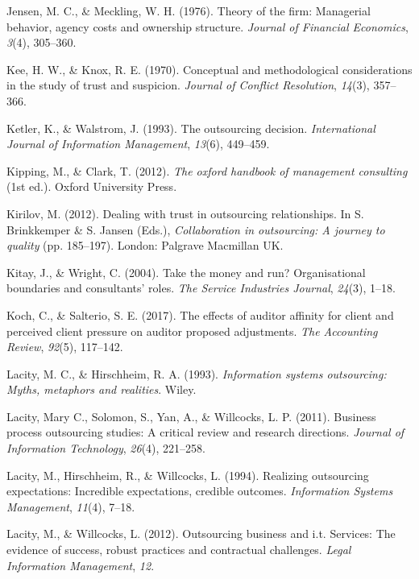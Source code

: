 \documentclass[
  man,floatsintext]{apa6}
\newlength{\cslhangindent}
\newenvironment{CSLReferences}[2] %
 {\begin{list}{}{%
  \setlength{\itemindent}{0pt}
  \setlength{\leftmargin}{0pt}
  \setlength{\parsep}{0pt}
  \ifodd #1
   \setlength{\leftmargin}{\cslhangindent}
   \setlength{\itemindent}{-1\cslhangindent}
  \fi
  \setlength{\itemsep}{#2\baselineskip}}}
 {\end{list}}
\begin{document}
\begin{CSLReferences}{1}{0}
Jensen, M. C., \& Meckling, W. H. (1976). Theory of the firm: Managerial behavior, agency costs and ownership structure. \emph{Journal of Financial Economics}, \emph{3}(4), 305--360.

Kee, H. W., \& Knox, R. E. (1970). Conceptual and methodological considerations in the study of trust and suspicion. \emph{Journal of Conflict Resolution}, \emph{14}(3), 357--366.

Ketler, K., \& Walstrom, J. (1993). The outsourcing decision. \emph{International Journal of Information Management}, \emph{13}(6), 449--459.

Kipping, M., \& Clark, T. (2012). \emph{The oxford handbook of management consulting} (1st ed.). Oxford University Press.

Kirilov, M. (2012). Dealing with trust in outsourcing relationships. In S. Brinkkemper \& S. Jansen (Eds.), \emph{Collaboration in outsourcing: A journey to quality} (pp. 185--197). London: Palgrave Macmillan UK.

Kitay, J., \& Wright, C. (2004). Take the money and run? Organisational boundaries and consultants' roles. \emph{The Service Industries Journal}, \emph{24}(3), 1--18.

Koch, C., \& Salterio, S. E. (2017). The effects of auditor affinity for client and perceived client pressure on auditor proposed adjustments. \emph{The Accounting Review}, \emph{92}(5), 117--142.

Lacity, M. C., \& Hirschheim, R. A. (1993). \emph{Information systems outsourcing: Myths, metaphors and realities}. Wiley.

Lacity, Mary C., Solomon, S., Yan, A., \& Willcocks, L. P. (2011). Business process outsourcing studies: A critical review and research directions. \emph{Journal of Information Technology}, \emph{26}(4), 221--258.

Lacity, M., Hirschheim, R., \& Willcocks, L. (1994). Realizing outsourcing expectations: Incredible expectations, credible outcomes. \emph{Information Systems Management}, \emph{11}(4), 7--18.

Lacity, M., \& Willcocks, L. (2012). Outsourcing business and i.t. Services: The evidence of success, robust practices and contractual challenges. \emph{Legal Information Management}, \emph{12}.


\end{CSLReferences}
\end{document}
